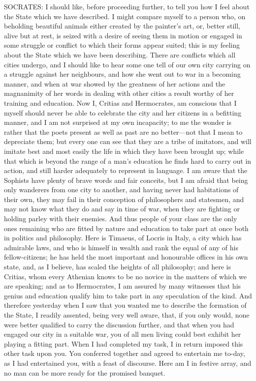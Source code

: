 SOCRATES: I should like, before proceeding further, to tell you how I feel
about the State which we have described. I might compare myself to a
person who, on beholding beautiful animals either created by the painter’s
art, or, better still, alive but at rest, is seized with a desire of
seeing them in motion or engaged in some struggle or conflict to which
their forms appear suited; this is my feeling about the State which we
have been describing. There are conflicts which all cities undergo, and I
should like to hear some one tell of our own city carrying on a struggle
against her neighbours, and how she went out to war in a becoming manner,
and when at war showed by the greatness of her actions and the magnanimity
of her words in dealing with other cities a result worthy of her training
and education. Now I, Critias and Hermocrates, am conscious that I myself
should never be able to celebrate the city and her citizens in a befitting
manner, and I am not surprised at my own incapacity; to me the wonder is
rather that the poets present as well as past are no better—not that
I mean to depreciate them; but every one can see that they are a tribe of
imitators, and will imitate best and most easily the life in which they
have been brought up; while that which is beyond the range of a man’s
education he finds hard to carry out in action, and still harder
adequately to represent in language. I am aware that the Sophists have
plenty of brave words and fair conceits, but I am afraid that being only
wanderers from one city to another, and having never had habitations of
their own, they may fail in their conception of philosophers and
statesmen, and may not know what they do and say in time of war, when they
are fighting or holding parley with their enemies. And thus people of your
class are the only ones remaining who are fitted by nature and education
to take part at once both in politics and philosophy. Here is Timaeus, of
Locris in Italy, a city which has admirable laws, and who is himself in
wealth and rank the equal of any of his fellow-citizens; he has held the
most important and honourable offices in his own state, and, as I believe,
has scaled the heights of all philosophy; and here is Critias, whom every
Athenian knows to be no novice in the matters of which we are speaking;
and as to Hermocrates, I am assured by many witnesses that his genius and
education qualify him to take part in any speculation of the kind. And
therefore yesterday when I saw that you wanted me to describe the
formation of the State, I readily assented, being very well aware, that,
if you only would, none were better qualified to carry the discussion
further, and that when you had engaged our city in a suitable war, you of
all men living could best exhibit her playing a fitting part. When I had
completed my task, I in return imposed this other task upon you. You
conferred together and agreed to entertain me to-day, as I had entertained
you, with a feast of discourse. Here am I in festive array, and no man can
be more ready for the promised banquet.

